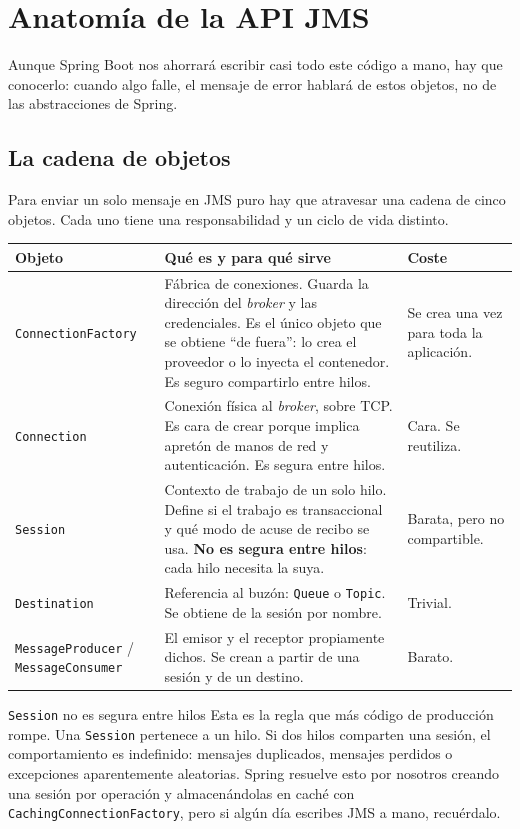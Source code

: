 \documentclass[11pt,a4paper]{book}
\newcommand{\clase}[1]{\texttt{#1}}
\begin{document}
\chapter{Anatomía de la API JMS}
\label{cap:anatomia}

Aunque Spring Boot nos ahorrará escribir casi todo este código a mano, hay que conocerlo: cuando algo falle, el mensaje de error hablará de estos objetos, no de las abstracciones de Spring.

\section{La cadena de objetos}

Para enviar un solo mensaje en JMS puro hay que atravesar una cadena de cinco objetos.
Cada uno tiene una responsabilidad y un ciclo de vida distinto.

\begin{center}
	\small
	\begin{tabularx}{\textwidth}{@{}p{3.2cm}Xp{3.4cm}@{}}
		\toprule
		\textbf{Objeto} & \textbf{Qué es y para qué sirve} & \textbf{Coste} \\
		\midrule
		\clase{ConnectionFactory} & Fábrica de conexiones. Guarda la dirección del \emph{broker} y las credenciales. Es el único objeto que se obtiene ``de fuera'': lo crea el proveedor o lo inyecta el contenedor. Es seguro compartirlo entre hilos. & Se crea una vez para toda la aplicación. \\
		\clase{Connection} & Conexión física al \emph{broker}, sobre TCP. Es cara de crear porque implica apretón de manos de red y autenticación. Es segura entre hilos. & Cara. Se reutiliza. \\
		\clase{Session} & Contexto de trabajo de un solo hilo. Define si el trabajo es transaccional y qué modo de acuse de recibo se usa. \textbf{No es segura entre hilos}: cada hilo necesita la suya. & Barata, pero no compartible. \\
		\clase{Destination} & Referencia al buzón: \clase{Queue} o \clase{Topic}. Se obtiene de la sesión por nombre. & Trivial. \\
		\clase{MessageProducer} / \clase{MessageConsumer} & El emisor y el receptor propiamente dichos. Se crean a partir de una sesión y de un destino. & Barato. \\
		\bottomrule
	\end{tabularx}
\end{center}

\begin{cajaAviso}{\clase{Session} no es segura entre hilos}
	Esta es la regla que más código de producción rompe.
	Una \clase{Session} pertenece a un hilo.
	Si dos hilos comparten una sesión, el comportamiento es indefinido: mensajes duplicados, mensajes perdidos o excepciones aparentemente aleatorias.
	Spring resuelve esto por nosotros creando una sesión por operación y almacenándolas en caché con \clase{CachingConnectionFactory}, pero si algún día escribes JMS a mano, recuérdalo.
\end{cajaAviso}
\end{document}
